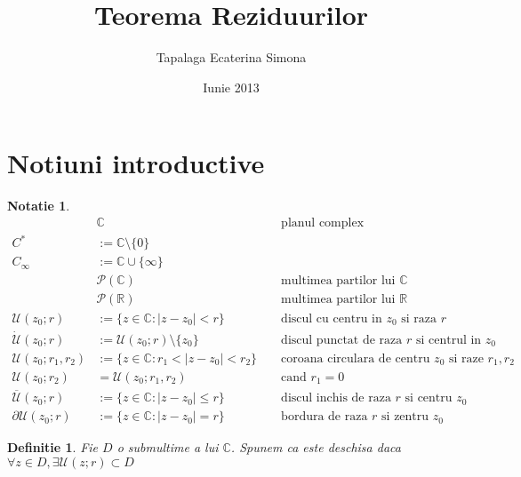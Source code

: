\documentclass[10pt,a4paper]{article}
\newtheorem{definition}{Definitie}
\newtheorem{notation}{Notatie}
\newcommand{\R}{\ensuremath{\mathbb{R}}}
\newcommand{\C}{\ensuremath{\mathbb{C}}}
\begin{document}
\title{Teorema Reziduurilor}
\author{Tapalaga Ecaterina Simona}
\date{Iunie 2013}
\maketitle


\section{Notiuni introductive}

\begin{notation}
	\begin{align*}
		&\C && \text{ planul complex} \\
		C^* &:= \C \setminus \{0\}   \\
		C_\infty &:= \C\cup \{\infty\} \\
		&\mathcal{P}(\C) && \text{ multimea partilor lui } \C \\
		&\mathcal{P}(\R) && \text{ multimea partilor lui } \R \\
		\mathcal{U}(z_0;r) &:= \{z \in \C \colon |z - z_0| < r \} && \text{ discul cu centru in } z_0 \text{ si raza } r \\
		\dot{\mathcal{U}}(z_0;r) &:= \mathcal{U}(z_0;r) \setminus \{z_0\} && \text{ discul punctat de raza } r \text{ si centrul in } z_0 \\
		\mathcal{U}(z_0;r_1,r_2) &:= \{z \in \C \colon r_1 < |z - z_0| < r_2 \} && \text{ coroana circulara de centru } z_0 \text { si raze } r_1 , r_2 \\
		\mathcal{U}(z_0;r_2) &= \mathcal{U}(z_0;r_1,r_2) && \text{ cand } r_1 = 0\\
		\overline{\mathcal{U}}(z_0;r) &:= \{z \in \C \colon |z - z_0| \leq r \} && \text{ discul inchis de raza } r \text{ si centru } z_0 \\
		\partial\mathcal{U}(z_0;r) &:= \{z \in \C \colon |z - z_0| = r \} && \text{ bordura de raza } r \text{ si zentru } z_0
	\end{align*}
\end{notation}

\begin{definition}
	Fie $D$ o submultime a lui $\C$.
	Spunem ca este deschisa daca $\forall z \in D, \exists \mathcal{U}(z;r) \subset D$
\end{definition}
\end{document}
